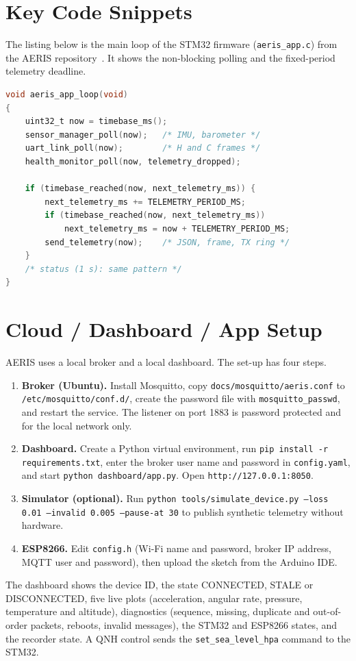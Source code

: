 \documentclass[12pt,a4paper]{report}
\begin{document}
\section{Key Code Snippets}
The listing below is the main loop of the STM32 firmware (\texttt{aeris\_app.c}) from the AERIS repository~\cite{aeris}. It shows the non-blocking polling and the fixed-period telemetry deadline.
\begin{lstlisting}[language=C,caption={STM32 main loop (aeris\_app.c, from the AERIS repository)}]
void aeris_app_loop(void)
{
    uint32_t now = timebase_ms();
    sensor_manager_poll(now);   /* IMU, barometer */
    uart_link_poll(now);        /* H and C frames */
    health_monitor_poll(now, telemetry_dropped);

    if (timebase_reached(now, next_telemetry_ms)) {
        next_telemetry_ms += TELEMETRY_PERIOD_MS;
        if (timebase_reached(now, next_telemetry_ms))
            next_telemetry_ms = now + TELEMETRY_PERIOD_MS;
        send_telemetry(now);    /* JSON, frame, TX ring */
    }
    /* status (1 s): same pattern */
}
\end{lstlisting}

\section{Cloud / Dashboard / App Setup}
AERIS uses a local broker and a local dashboard. The set-up has four steps.
\begin{enumerate}
\item \textbf{Broker (Ubuntu).} Install Mosquitto, copy \texttt{docs/mosquitto/aeris.conf} to \texttt{/etc/mosquitto/conf.d/}, create the password file with \texttt{mosquitto\_passwd}, and restart the service. The listener on port 1883 is password protected and for the local network only.
\item \textbf{Dashboard.} Create a Python virtual environment, run \texttt{pip install -r requirements.txt}, enter the broker user name and password in \texttt{config.yaml}, and start \texttt{python dashboard/app.py}. Open \texttt{http://127.0.0.1:8050}.
\item \textbf{Simulator (optional).} Run \texttt{python tools/simulate\_device.py --loss 0.01 --invalid 0.005 --pause-at 30} to publish synthetic telemetry without hardware.
\item \textbf{ESP8266.} Edit \texttt{config.h} (Wi-Fi name and password, broker IP address, MQTT user and password), then upload the sketch from the Arduino IDE.
\end{enumerate}
The dashboard shows the device ID, the state CONNECTED, STALE or DISCONNECTED, five live plots (acceleration, angular rate, pressure, temperature and altitude), diagnostics (sequence, missing, duplicate and out-of-order packets, reboots, invalid messages), the STM32 and ESP8266 states, and the recorder state. A QNH control sends the \texttt{set\_sea\_level\_hpa} command to the STM32.
\end{document}
